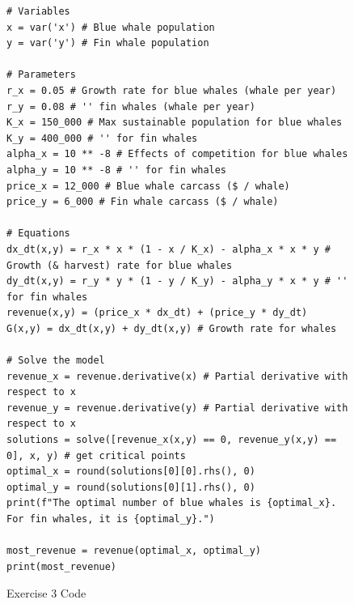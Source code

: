 \documentclass[12pt, oneside]{book}
\begin{document}
\begin{figure}
    \label{ex:3}
    \begin{verbatim}
# Variables
x = var('x') # Blue whale population
y = var('y') # Fin whale population

# Parameters
r_x = 0.05 # Growth rate for blue whales (whale per year)
r_y = 0.08 # '' fin whales (whale per year)
K_x = 150_000 # Max sustainable population for blue whales 
K_y = 400_000 # '' for fin whales 
alpha_x = 10 ** -8 # Effects of competition for blue whales
alpha_y = 10 ** -8 # '' for fin whales
price_x = 12_000 # Blue whale carcass ($ / whale)
price_y = 6_000 # Fin whale carcass ($ / whale)

# Equations
dx_dt(x,y) = r_x * x * (1 - x / K_x) - alpha_x * x * y # Growth (& harvest) rate for blue whales
dy_dt(x,y) = r_y * y * (1 - y / K_y) - alpha_y * x * y # '' for fin whales
revenue(x,y) = (price_x * dx_dt) + (price_y * dy_dt)
G(x,y) = dx_dt(x,y) + dy_dt(x,y) # Growth rate for whales

# Solve the model
revenue_x = revenue.derivative(x) # Partial derivative with respect to x
revenue_y = revenue.derivative(y) # Partial derivative with respect to x
solutions = solve([revenue_x(x,y) == 0, revenue_y(x,y) == 0], x, y) # get critical points
optimal_x = round(solutions[0][0].rhs(), 0)
optimal_y = round(solutions[0][1].rhs(), 0)
print(f"The optimal number of blue whales is {optimal_x}. For fin whales, it is {optimal_y}.")

most_revenue = revenue(optimal_x, optimal_y)
print(most_revenue)
    \end{verbatim}

    \caption{Exercise 3 Code}
    
\end{figure}
\end{document}
